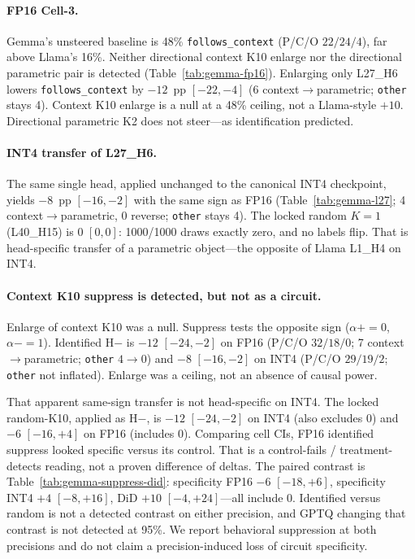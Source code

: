 \documentclass{article} %
\begin{document}
\paragraph{FP16 Cell-3.}
Gemma's unsteered baseline is 48\% \texttt{follows\_context} (P/C/O $22/24/4$), far above Llama's 16\%. Neither directional context K10 enlarge nor the directional parametric pair is detected (Table~\ref{tab:gemma-fp16}). Enlarging only L27\_H6 lowers \texttt{follows\_context} by $-12$~pp $[-22,-4]$ (6 context$\to$parametric; \texttt{other} stays 4). Context K10 enlarge is a null at a 48\% ceiling, not a Llama-style $+10$. Directional parametric K2 does not steer---as identification predicted.

\paragraph{INT4 transfer of L27\_H6.}
The same single head, applied unchanged to the canonical INT4 checkpoint, yields $-8$~pp $[-16,-2]$ with the same sign as FP16 (Table~\ref{tab:gemma-l27}; 4 context$\to$parametric, 0 reverse; \texttt{other} stays 4). The locked random $K{=}1$ (L40\_H15) is $0$ $[0,0]$: 1000/1000 draws exactly zero, and no labels flip. That is head-specific transfer of a parametric object---the opposite of Llama L1\_H4 on INT4.

\paragraph{Context K10 suppress is detected, but not as a circuit.}
Enlarge of context K10 was a null. Suppress tests the opposite sign ($\alpha{+}{=}0$, $\alpha{-}{=}1$). Identified H$-$ is $-12$ $[-24,-2]$ on FP16 (P/C/O $32/18/0$; 7 context$\to$parametric; \texttt{other} $4{\to}0$) and $-8$ $[-16,-2]$ on INT4 (P/C/O $29/19/2$; \texttt{other} not inflated). Enlarge was a ceiling, not an absence of causal power.

That apparent same-sign transfer is not head-specific on INT4. The locked random-K10, applied as H$-$, is $-12$ $[-24,-2]$ on INT4 (also excludes 0) and $-6$ $[-16,+4]$ on FP16 (includes 0). Comparing cell CIs, FP16 identified suppress looked specific versus its control. That is a control-fails / treatment-detects reading, not a proven difference of deltas. The paired contrast is Table~\ref{tab:gemma-suppress-did}: specificity FP16 $-6$ $[-18,+6]$, specificity INT4 $+4$ $[-8,+16]$, DiD $+10$ $[-4,+24]$---all include 0. Identified versus random is not a detected contrast on either precision, and GPTQ changing that contrast is not detected at 95\%. We report behavioral suppression at both precisions and do not claim a precision-induced loss of circuit specificity.
\end{document}
